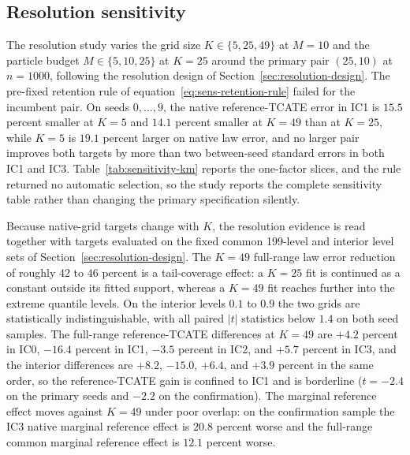 \subsection{Resolution sensitivity}\label{sec:results-resolution}

The resolution study varies the grid size $K\in\{5,25,49\}$ at $M=10$ and the particle budget $M\in\{5,10,25\}$ at $K=25$ around the primary pair $(25,10)$ at $n=1000$, following the resolution design of Section~\ref{sec:resolution-design}. The pre-fixed retention rule of equation~\eqref{eq:sens-retention-rule} failed for the incumbent pair. On seeds $0,\ldots,9$, the native reference-TCATE error in IC1 is $15.5$ percent smaller at $K=5$ and $14.1$ percent smaller at $K=49$ than at $K=25$, while $K=5$ is $19.1$ percent larger on native law error, and no larger pair improves both targets by more than two between-seed standard errors in both IC1 and IC3. Table~\ref{tab:sensitivity-km} reports the one-factor slices, and the rule returned no automatic selection, so the study reports the complete sensitivity table rather than changing the primary specification silently.



Because native-grid targets change with $K$, the resolution evidence is read together with targets evaluated on the fixed common 199-level and interior level sets of Section~\ref{sec:resolution-design}. The $K=49$ full-range law error reduction of roughly $42$ to $46$ percent is a tail-coverage effect: a $K=25$ fit is continued as a constant outside its fitted support, whereas a $K=49$ fit reaches further into the extreme quantile levels. On the interior levels $0.1$ to $0.9$ the two grids are statistically indistinguishable, with all paired $|t|$ statistics below $1.4$ on both seed samples. The full-range reference-TCATE differences at $K=49$ are $+4.2$ percent in IC0, $-16.4$ percent in IC1, $-3.5$ percent in IC2, and $+5.7$ percent in IC3, and the interior differences are $+8.2$, $-15.0$, $+6.4$, and $+3.9$ percent in the same order, so the reference-TCATE gain is confined to IC1 and is borderline ($t=-2.4$ on the primary seeds and $-2.2$ on the confirmation). The marginal reference effect moves against $K=49$ under poor overlap: on the confirmation sample the IC3 native marginal reference effect is $20.8$ percent worse and the full-range common marginal reference effect is $12.1$ percent worse.



